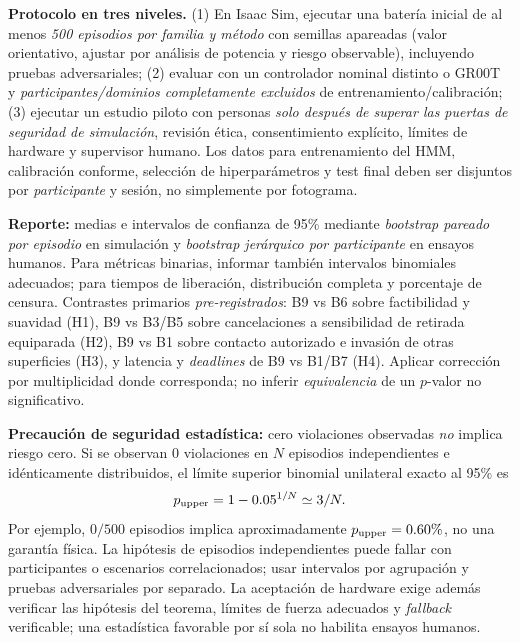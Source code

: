 \documentclass[10pt,a4paper,twocolumn]{article}
\begin{document}
\textbf{Protocolo en tres niveles.} (1) En Isaac Sim, ejecutar una batería inicial de al menos \emph{500 episodios por familia y método} con semillas apareadas (valor orientativo, ajustar por análisis de potencia y riesgo observable), incluyendo pruebas adversariales; (2) evaluar con un controlador nominal distinto o GR00T y \emph{participantes/dominios completamente excluidos} de entrenamiento/calibración; (3) ejecutar un estudio piloto con personas \emph{solo después de superar las puertas de seguridad de simulación}, revisión ética, consentimiento explícito, límites de hardware y supervisor humano. Los datos para entrenamiento del HMM, calibración conforme, selección de hiperparámetros y test final deben ser disjuntos por \emph{participante} y sesión, no simplemente por fotograma.

\textbf{Reporte:} medias e intervalos de confianza de 95\% mediante \emph{bootstrap pareado por episodio} en simulación y \emph{bootstrap jerárquico por participante} en ensayos humanos. Para métricas binarias, informar también intervalos binomiales adecuados; para tiempos de liberación, distribución completa y porcentaje de censura. Contrastes primarios \emph{pre-registrados}: B9 vs B6 sobre factibilidad y suavidad (H1), B9 vs B3/B5 sobre cancelaciones a sensibilidad de retirada equiparada (H2), B9 vs B1 sobre contacto autorizado e invasión de otras superficies (H3), y latencia y \emph{deadlines} de B9 vs B1/B7 (H4). Aplicar corrección por multiplicidad donde corresponda; no inferir \emph{equivalencia} de un $p$-valor no significativo.

\textbf{Precaución de seguridad estadística:} cero violaciones observadas \emph{no} implica riesgo cero. Si se observan $0$ violaciones en $N$ episodios independientes e idénticamente distribuidos, el límite superior binomial unilateral exacto al 95\% es
\begin{equation}
 p_{\rm upper}=1-0.05^{1/N}\simeq 3/N.
 \label{eq:zeroevents}
\end{equation}
Por ejemplo, $0/500$ episodios implica aproximadamente $p_{\rm upper}=0.60\%$, no una garantía física. La hipótesis de episodios independientes puede fallar con participantes o escenarios correlacionados; usar intervalos por agrupación y pruebas adversariales por separado. La aceptación de hardware exige además verificar las hipótesis del teorema, límites de fuerza adecuados y \emph{fallback} verificable; una estadística favorable por sí sola no habilita ensayos humanos.
\end{document}
